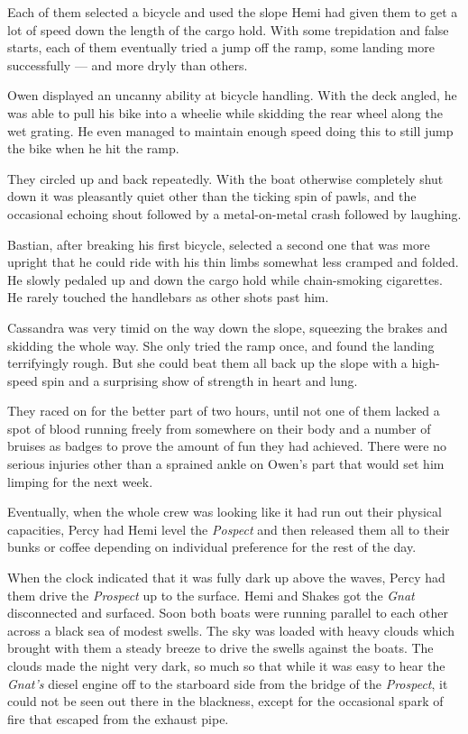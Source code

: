 \documentclass[]{scrbook}
\begin{document}
Each of them selected a bicycle and used the slope Hemi had given them
to get a lot of speed down the length of the cargo hold. With some
trepidation and false starts, each of them eventually tried a jump off
the ramp, some landing more successfully --- and more dryly than others.

Owen displayed an uncanny ability at bicycle handling. With the deck
angled, he was able to pull his bike into a wheelie while skidding the
rear wheel along the wet grating. He even managed to maintain enough
speed doing this to still jump the bike when he hit the ramp.

They circled up and back repeatedly. With the boat otherwise completely
shut down it was pleasantly quiet other than the ticking spin of pawls,
and the occasional echoing shout followed by a metal-on-metal crash
followed by laughing.

Bastian, after breaking his first bicycle, selected a second one that
was more upright that he could ride with his thin limbs somewhat less
cramped and folded. He slowly pedaled up and down the cargo hold while
chain-smoking cigarettes. He rarely touched the handlebars as other
shots past him.

Cassandra was very timid on the way down the slope, squeezing the brakes
and skidding the whole way. She only tried the ramp once, and found the
landing terrifyingly rough. But she could beat them all back up the
slope with a high-speed spin and a surprising show of strength in heart
and lung.

They raced on for the better part of two hours, until not one of them
lacked a spot of blood running freely from somewhere on their body and a
number of bruises as badges to prove the amount of fun they had
achieved. There were no serious injuries other than a sprained ankle on
Owen's part that would set him limping for the next week.

Eventually, when the whole crew was looking like it had run out their
physical capacities, Percy had Hemi level the \emph{Pospect} and then
released them all to their bunks or coffee depending on individual
preference for the rest of the day.

When the clock indicated that it was fully dark up above the waves,
Percy had them drive the \emph{Prospect} up to the surface. Hemi and
Shakes got the \emph{Gnat} disconnected and surfaced. Soon both boats
were running parallel to each other across a black sea of modest swells.
The sky was loaded with heavy clouds which brought with them a steady
breeze to drive the swells against the boats. The clouds made the night
very dark, so much so that while it was easy to hear the \emph{Gnat's}
diesel engine off to the starboard side from the bridge of the
\emph{Prospect}, it could not be seen out there in the blackness, except
for the occasional spark of fire that escaped from the exhaust pipe.
\end{document}
